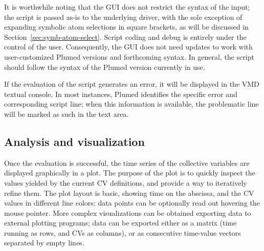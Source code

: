 \documentclass[preprint,12pt]{elsarticle}
\begin{document}
It is worthwhile noting that the GUI does not restrict the syntax of
the input; the script is passed as-is to the underlying driver, with
the sole exception of expanding symbolic atom selections in square
brackets, as will be discussed in  Section~\ref{sec:symb-atom-select}.
Script coding and
debug is entirely under the control of the user.  Consequently, the
GUI does not need updates to work with user-customized Plumed versions
and forthcoming syntax. In general, the script should follow the
syntax of the Plumed version currently in use.

If the evaluation of the script generates an error, it will be
displayed in the VMD textual console.  In most instances, Plumed
identifies the specific error and corresponding script line; when this
information is available, the problematic line will be marked as such
in the text area.



\subsection{Analysis and visualization}

Once the evaluation is successful, the time series of the collective
variables are displayed graphically in a plot.  The purpose of the
plot is to quickly inspect the values yielded by the current CV
definitions, and provide a way to iteratively refine them. The plot
layout is basic, showing time on the abscissa, and the CV values in
different line colors; data points can be optionally read out hovering the
mouse pointer.  More complex visualizations can be obtained exporting
data to external plotting programs; data can be exported 
either as a matrix (time running as rows, and CVs as
columns), or as consecutive time-value vectors separated by empty
lines.
\end{document}
